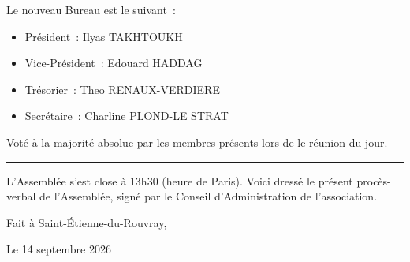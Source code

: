 \documentclass{article}
\newcommand{\mydate}{14 septembre 2026}
\begin{document}
\begin{flushleft}
  Le nouveau Bureau est le suivant~:
  \begin{itemize}
    \item Président~: Ilyas TAKHTOUKH
    \item Vice-Président~: Edouard HADDAG
    \item Trésorier~: Theo RENAUX-VERDIERE
    \item Secrétaire~: Charline PLOND-LE STRAT
  \end{itemize}
\end{flushleft}

Voté à la majorité absolue par les membres présents lors de le réunion du
jour.

\noindent\rule{\textwidth}{1pt}

\vspace{10pt}

L'Assemblée s'est close à 13h30 (heure de Paris). Voici dressé le présent
procès-verbal de l'Assemblée, signé par le Conseil d'Administration de
l'association.

\vspace{10pt}

\begin{flushright}
  Fait à Saint-Étienne-du-Rouvray,
\end{flushright}

\begin{flushright}
  Le \mydate{}
\end{flushright}
\end{document}
